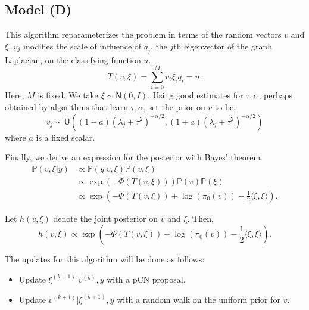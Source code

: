 \documentclass{siamart1116}
\begin{document}
    \subsection{Model (D)} \label{sec:algorithms_model_d}
        This algorithm reparameterizes the problem in terms of the random vectors $v$ and $\xi$. $v_j$ modifies the scale of influence of $q_j$, the $j$th eigenvector of the graph Laplacian, on the classifying function $u$.
        \begin{equation}
        \label{eqn:v_T}
        T(v,\xi) = \sum_{i=0}^{M} v_i\xi_iq_i = u.
        \end{equation}
        Here, $M$ is fixed. We take $\xi \sim \mathsf{N}(0, I)$. Using good estimates for $\tau, \alpha$, perhaps obtained by algorithms that learn $\tau, \alpha$, set the prior on $v$ to be:
        \[v_j \sim \mathsf{U}\left((1-a)(\lambda_j+\tau^2)^{-\alpha/2},(1+a)(\lambda_j+\tau^2)^{-\alpha/2}\right)\]
        where $a$ is a fixed scalar.

        Finally, we derive an expression for the posterior with Bayes' theorem.
        \begin{align*}
        \mathbb{P}(v,\xi | y) &\propto \mathbb{P}(y|v, \xi) \mathbb{P}(v, \xi)\\
        &\propto \exp \left(-\Phi(T(v,\xi)) \right) \mathbb{P}(v)\mathbb{P}(\xi) \\
        &\propto \exp \left(-\Phi(T(v,\xi)) + \log (\pi_0(v)) - \frac{1}{2}\langle \xi, \xi \rangle  \right).
        \end{align*}

        Let $h(v,\xi)$ denote the joint posterior on $v$ and $\xi$. Then,
        \begin{equation}
        \label{eqn:learn_v_posterior}
        h(v, \xi) \propto \exp \left(-\Phi(T(v,\xi)) + \log (\pi_0(v)) - \frac{1}{2}\langle \xi, \xi \rangle  \right).
        \end{equation}

        The updates for this algorithm will be done as follows:

        \begin{itemize}
            \item Update $\xi^{(k+1)} | v^{(k)}, y$ with a pCN proposal.
            \item Update $v^{(k+1)} | \xi^{(k+1)}, y$ with a random walk on the uniform prior for $v$.
        \end{itemize}
\end{document}
